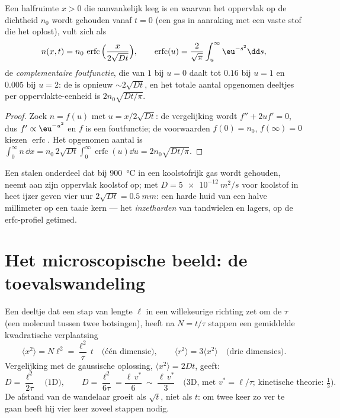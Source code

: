 \begin{proposition}\label{prop:b2:particle-diffusion:erfc}
Een halfruimte $x > 0$ die aanvankelijk leeg is en waarvan het oppervlak op
de dichtheid $n_0$ wordt gehouden vanaf $t = 0$ (een gas in aanraking met
een vaste stof die
het oplost), vult zich als
\[
n(x,t) = n_0\,\operatorname{erfc}\Big(\frac{x}{2\sqrt{Dt}}\Big),
\qquad
\operatorname{erfc}(u) = \frac{2}{\sqrt\pi}\int_u^{\infty}\eu^{-s^2}\dd s,
\]
de \emph{complementaire foutfunctie}, die van $1$ bij $u =
0$ daalt tot
$0.16$ bij $u = 1$ en $0.005$ bij $u = 2$: de  is
opnieuw $\sim 2\sqrt{Dt}$, en het totale aantal opgenomen deeltjes per
oppervlakte-eenheid is $2n_0\sqrt{Dt/\pi}$.
\end{proposition}

\begin{proof}
Zoek $n = f(u)$ met $u = x/2\sqrt{Dt}$: de vergelijking wordt
$f'' + 2uf' = 0$, dus $f' \propto \eu^{-u^2}$ en $f$ is een foutfunctie;
de voorwaarden $f(0) = n_0$, $f(\infty) = 0$ kiezen
$\operatorname{erfc}$. Het opgenomen aantal is
$\int_0^\infty n\,\dd x =
n_0\,2\sqrt{Dt}\int_0^\infty\operatorname{erfc}(u)\dd u = 2n_0\sqrt{Dt/\pi}$.
\end{proof}

\begin{example}\label{ex:b2:particle-diffusion:carburising}
Een stalen onderdeel dat bij \qty{900}{\celsius} in een koolstofrijk gas
wordt gehouden, neemt
aan zijn oppervlak koolstof op; met $D = \qty{5e-12}{m^2/s}$ voor koolstof in heet
ijzer geven vier uur $2\sqrt{Dt} = \qty{0.5}{mm}$: een harde huid van een halve
millimeter op een taaie kern --- het \emph{inzetharden} van tandwielen en
lagers, op de erfc-profiel getimed.
\end{example}

\section{Het microscopische beeld: de
toevalswandeling}\label{sec:b2:particle-diffusion:microscopic}

\begin{proposition}\label{prop:b2:particle-diffusion:walk}
Een deeltje dat een stap van lengte $\ell$ in een willekeurige richting zet
om de $\tau$ (een molecuul tussen twee botsingen), heeft na $N =
t/\tau$
stappen een
gemiddelde kwadratische verplaatsing
\[
\langle x^2\rangle = N\ell^2 = \frac{\ell^2}{\tau}\,t
\quad\text{(één dimensie)}, \qquad
\langle r^2\rangle = 3\langle x^2\rangle \quad\text{(drie dimensies)}.
\]
Vergelijking met de gaussische oplossing, $\langle x^2\rangle = 2Dt$, geeft:
\[
D = \frac{\ell^2}{2\tau} \quad\text{(1D)}, \qquad
D = \frac{\ell^2}{6\tau} = \frac{\ell\,v^*}{6}\ \sim\ \frac{\ell\,v^*}{3}
\quad\text{(3D, met } v^* = \ell/\tau\text{; kinetische theorie: } \tfrac13) .
\]
De afstand van de wandelaar groeit als $\sqrt t$, niet als $t$: om twee keer
zo ver te gaan
heeft hij vier keer zoveel stappen nodig.
\end{proposition}

